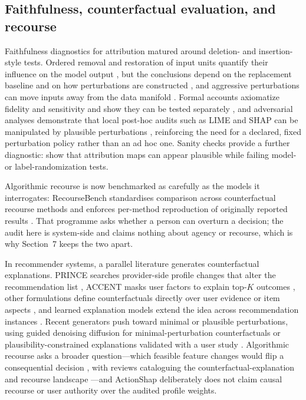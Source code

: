 \documentclass[manuscript,screen,review,anonymous]{acmart}
\begin{document}
\subsection{Faithfulness, counterfactual evaluation, and recourse}
Faithfulness diagnostics for attribution matured around deletion- and insertion-style tests. Ordered removal and restoration of input units quantify their influence on the model output \citep{petsiuk2018rise}, but the conclusions depend on the replacement baseline and on how perturbations are constructed \citep{fong2017meaningful}, and aggressive perturbations can move inputs away from the data manifold \citep{hooker2019}. Formal accounts axiomatize fidelity and sensitivity and show they can be tested separately \citep{yeh2019infidelity}, and adversarial analyses demonstrate that local post-hoc audits such as LIME and SHAP can be manipulated by plausible perturbations \citep{slack2020fooling}, reinforcing the need for a declared, fixed perturbation policy rather than an ad hoc one. Sanity checks provide a further diagnostic: \citet{adebayo2018} show that attribution maps can appear plausible while failing model- or label-randomization tests.

Algorithmic recourse is now benchmarked as carefully as the models it interrogates: RecourseBench standardises comparison across counterfactual recourse methods and enforces per-method reproduction of originally reported results \cite{khotanlou2026recoursebench}. That programme asks whether a person can overturn a decision; the audit here is system-side and claims nothing about agency or recourse, which is why Section~7 keeps the two apart.

In recommender systems, a parallel literature generates counterfactual explanations. PRINCE searches provider-side profile changes that alter the recommendation list \citep{ghazimatin2020}, ACCENT masks user factors to explain top-$K$ outcomes \citep{tran2021}, other formulations define counterfactuals directly over user evidence or item aspects \citep{tan2021,barkan2024}, and learned explanation models extend the idea across recommendation instances \citep{gurevitch2025}. Recent generators push toward minimal or plausible perturbations, using guided denoising diffusion for minimal-perturbation counterfactuals \citep{mohammadi2026sigir} or plausibility-constrained explanations validated with a user study \citep{cerny2025plausible}. Algorithmic recourse asks a broader question---which feasible feature changes would flip a consequential decision \citep{wachter2017,karimi2021}, with reviews cataloguing the counterfactual-explanation and recourse landscape \citep{verma2022counterfactual}---and ActionShap deliberately does not claim causal recourse or user authority over the audited profile weights.
\end{document}
